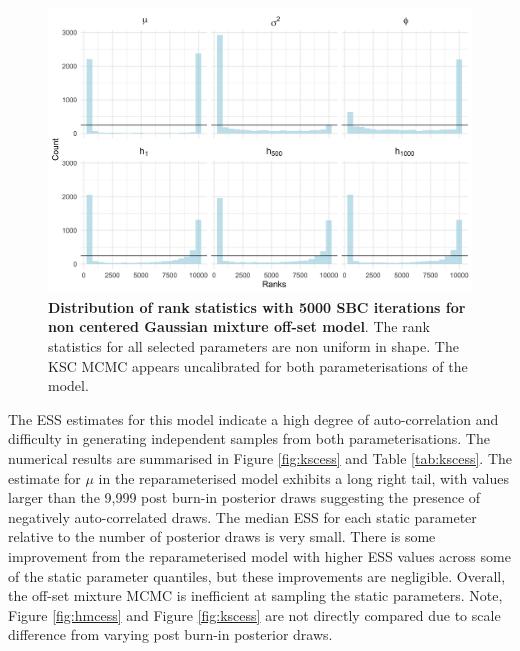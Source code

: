 \documentclass[12pt, a4paper]{article}
\begin{document}
    \begin{figure}[H]
        \centering
        \includegraphics[scale=0.09]{results/ksc_ncp_5k.png}
        \caption{\textbf{Distribution of rank statistics with 5000 SBC iterations for non centered Gaussian mixture off-set model}. The rank statistics for all selected parameters are non uniform in shape. The KSC MCMC appears uncalibrated for both parameterisations of the model.}
        \label{fig:ncpksc5k}
    \end{figure}

    The ESS estimates for this model indicate a high degree of auto-correlation and difficulty in generating independent samples from both parameterisations. The numerical results are summarised in Figure \ref{fig:kscess} and Table \ref{tab:kscess}. The estimate for $\mu$ in the reparameterised model exhibits a long right tail, with values larger than the 9,999 post burn-in posterior draws suggesting the presence of negatively auto-correlated draws. The median ESS for each static parameter relative to the number of posterior draws is very small. There is some improvement from the reparameterised model with higher ESS values across some of the static parameter quantiles, but these improvements are negligible. Overall, the off-set mixture MCMC is inefficient at sampling the static parameters. Note, Figure \ref{fig:hmcess} and Figure \ref{fig:kscess} are not directly compared due to scale difference from varying post burn-in posterior draws.
    
    
\end{document}

